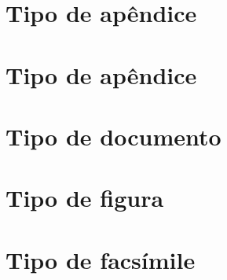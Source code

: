 \documentclass[
	12pt,					%
	openright,			%
	twoside,			%
	a4paper,			%
	english,				%
	french,				%
	spanish,			%
	brazil				%
	]{abntex2}
\begin{document}
\begin{apendicesenv}

\partapendices

\chapter{Tipo de apêndice}

\lipsum[50]

\chapter{Tipo de apêndice}
\lipsum[55-57]

\end{apendicesenv}



\begin{anexosenv}

\partanexos

\chapter{Tipo de documento}
\lipsum[50]



\chapter{Tipo de figura}
\lipsum[50]



\chapter{Tipo de facsímile}
\lipsum[50]



\end{anexosenv}

\printindex
\end{document}

